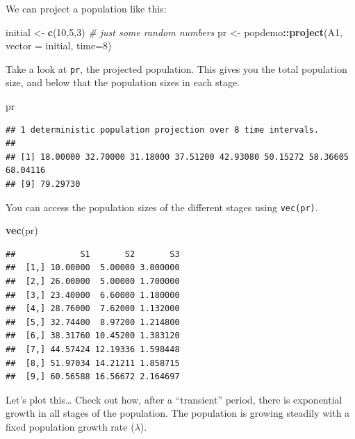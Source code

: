 \documentclass[
  a4paper]{book}
\newenvironment{Shaded}{\begin{snugshade}}{\end{snugshade}}
\newcommand{\AttributeTok}[1]{\textcolor[rgb]{0.13,0.29,0.53}{#1}}
\newcommand{\CommentTok}[1]{\textcolor[rgb]{0.56,0.35,0.01}{\textit{#1}}}
\newcommand{\DecValTok}[1]{\textcolor[rgb]{0.00,0.00,0.81}{#1}}
\newcommand{\FunctionTok}[1]{\textcolor[rgb]{0.13,0.29,0.53}{\textbf{#1}}}
\newcommand{\NormalTok}[1]{#1}
\newcommand{\OtherTok}[1]{\textcolor[rgb]{0.56,0.35,0.01}{#1}}
\newcommand{\SpecialCharTok}[1]{\textcolor[rgb]{0.81,0.36,0.00}{\textbf{#1}}}
\begin{document}
We can project a population like this:

\begin{Shaded}
\begin{Highlighting}[]
\NormalTok{initial }\OtherTok{\textless{}{-}} \FunctionTok{c}\NormalTok{(}\DecValTok{10}\NormalTok{,}\DecValTok{5}\NormalTok{,}\DecValTok{3}\NormalTok{) }\CommentTok{\# just some random numbers}
\NormalTok{pr }\OtherTok{\textless{}{-}}\NormalTok{ popdemo}\SpecialCharTok{::}\FunctionTok{project}\NormalTok{(A1, }\AttributeTok{vector =}\NormalTok{ initial, }\AttributeTok{time=}\DecValTok{8}\NormalTok{)}
\end{Highlighting}
\end{Shaded}

Take a look at \texttt{pr}, the projected population. This gives you the total population size, and below that the population sizes in each stage.

\begin{Shaded}
\begin{Highlighting}[]
\NormalTok{pr}
\end{Highlighting}
\end{Shaded}

\begin{verbatim}
## 1 deterministic population projection over 8 time intervals.
## 
## [1] 18.00000 32.70000 31.18000 37.51200 42.93080 50.15272 58.36605 68.04116
## [9] 79.29730
\end{verbatim}

You can access the population sizes of the different stages using \texttt{vec(pr)}.

\begin{Shaded}
\begin{Highlighting}[]
\FunctionTok{vec}\NormalTok{(pr)}
\end{Highlighting}
\end{Shaded}

\begin{verbatim}
##             S1       S2       S3
##  [1,] 10.00000  5.00000 3.000000
##  [2,] 26.00000  5.00000 1.700000
##  [3,] 23.40000  6.60000 1.180000
##  [4,] 28.76000  7.62000 1.132000
##  [5,] 32.74400  8.97200 1.214800
##  [6,] 38.31760 10.45200 1.383120
##  [7,] 44.57424 12.19336 1.598448
##  [8,] 51.97034 14.21211 1.858715
##  [9,] 60.56588 16.56672 2.164697
\end{verbatim}

Let's plot this\ldots{} Check out how, after a ``transient'' period, there is exponential growth in all stages of the population. The population is growing steadily with a fixed population growth rate (\(\lambda\)).
\end{document}

